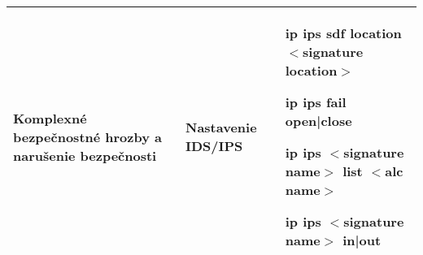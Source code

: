 \begin{longtable}[!htbp]{|L{10em}L{10em}>{\selectfont}L{34em}|}
	
	
	Komplexné bezpečnostné hrozby a narušenie bezpečnosti	&Nastavenie IDS/IPS	&ip ips sdf location $<$signature location$>$
	
	ip ips fail  open|close
	
	ip ips $<$signature name$>$ list $<$alc name$>$
	
	ip ips $<$signature name$>$ in|out\\
	
	
	\hline
	
\end{longtable}%



\restoregeometry
\normalsize
\fi
